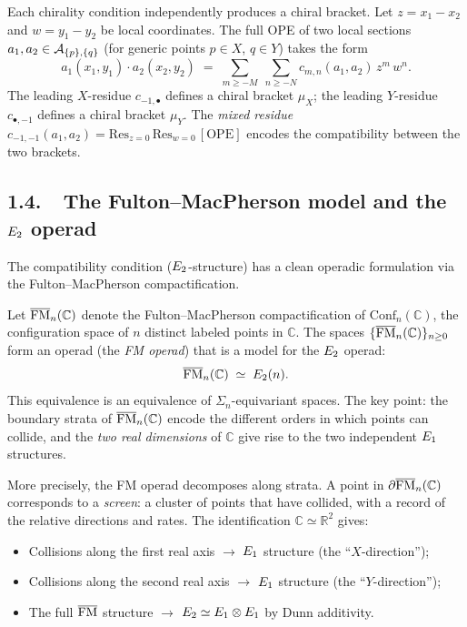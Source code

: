 \medskip
Each chirality condition independently produces a chiral bracket.
Let $z = x_1 - x_2$ and $w = y_1 - y_2$ be local coordinates.
The full OPE of two local sections $a_1, a_2 \in \mathcal{A}_{\{p\}, \{q\}}$
(for generic points $p \in X$, $q \in Y$) takes the form
\begin{equation}\label{eq:double-ope}
 a_1(x_1, y_1) \cdot a_2(x_2, y_2)
 \;=\;
 \sum_{m \geq -M}\; \sum_{n \geq -N}
 c_{m,n}(a_1, a_2)\, z^m\, w^n.
\end{equation}
The leading $X$-residue $c_{-1, \bullet}$ defines a chiral bracket
$\mu_X$; the leading $Y$-residue $c_{\bullet, -1}$ defines a chiral
bracket $\mu_Y$. The \emph{mixed residue}
$c_{-1,-1}(a_1, a_2) = \mathrm{Res}_{z=0}\, \mathrm{Res}_{w=0}\,
[\text{OPE}]$ encodes the compatibility between the two brackets.

\subsection*{1.4.\ \ The Fulton--MacPherson model and the $E_2$ operad}

The compatibility condition ($E_2$-structure) has a clean operadic
formulation via the Fulton--MacPherson compactification.

Let $\overline{\mathrm{FM}}_n(\mathbb{C})$ denote the Fulton--MacPherson compactification of
$\mathrm{Conf}_n(\mathbb{C})$, the configuration space of $n$ distinct
labeled points in $\mathbb{C}$. The spaces $\{\overline{\mathrm{FM}}_n(\mathbb{C})\}_{n \geq
0}$ form an operad (the \emph{FM operad}) that is a model for the
$E_2$ operad:
\begin{equation}\label{eq:fm-e2}
 \overline{\mathrm{FM}}_n(\mathbb{C}) \;\simeq\; E_2(n).
\end{equation}
This equivalence is an equivalence of $\Sigma_n$-equivariant spaces.
The key point: the boundary strata of $\overline{\mathrm{FM}}_n(\mathbb{C})$ encode the
different orders in which points can collide, and the \emph{two real
dimensions} of $\mathbb{C}$ give rise to the two independent $E_1$
structures.

More precisely, the FM operad decomposes along strata. A point in
$\partial \overline{\mathrm{FM}}_n(\mathbb{C})$ corresponds to a \emph{screen}: a cluster
of points that have collided, with a record of the relative directions
and rates. The identification $\mathbb{C} \simeq \mathbb{R}^2$ gives:
\begin{itemize}
 \item Collisions along the first real axis $\to$ $E_1$ structure
 (the ``$X$-direction'');
 \item Collisions along the second real axis $\to$ $E_1$ structure
 (the ``$Y$-direction'');
 \item The full $\overline{\mathrm{FM}}$ structure $\to$ $E_2 \simeq E_1 \otimes E_1$
 by Dunn additivity.
\end{itemize}

